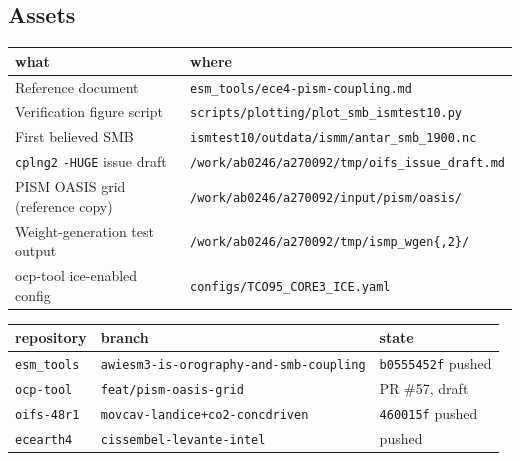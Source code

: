 \documentclass[11pt,a4paper]{article}
\newcommand{\code}[1]{\texttt{\small #1}}
\begin{document}
\subsection{Assets}

\begin{center}
\begin{tabular}{@{}ll@{}}
\toprule
what & where \\
\midrule
Reference document & \code{esm\_tools/ece4-pism-coupling.md} \\
Verification figure script & \code{scripts/plotting/plot\_smb\_ismtest10.py} \\
First believed SMB & \code{ismtest10/outdata/ismm/antar\_smb\_1900.nc} \\
\code{cplng2} \code{-HUGE} issue draft & \code{/work/ab0246/a270092/tmp/oifs\_issue\_draft.md} \\
PISM OASIS grid (reference copy) & \code{/work/ab0246/a270092/input/pism/oasis/} \\
Weight-generation test output & \code{/work/ab0246/a270092/tmp/ismp\_wgen\{,2\}/} \\
ocp-tool ice-enabled config & \code{configs/TCO95\_CORE3\_ICE.yaml} \\
\bottomrule
\end{tabular}
\end{center}

\begin{center}
\begin{tabular}{@{}lll@{}}
\toprule
repository & branch & state \\
\midrule
\code{esm\_tools} & \code{awiesm3-is-orography-and-smb-coupling} & \code{b0555452f} pushed \\
\code{ocp-tool}   & \code{feat/pism-oasis-grid}                  & PR \#57, draft \\
\code{oifs-48r1}  & \code{movcav-landice+co2-concdriven}         & \code{460015f} pushed \\
\code{ecearth4}   & \code{cissembel-levante-intel}               & pushed \\
\bottomrule
\end{tabular}
\end{center}
\end{document}

